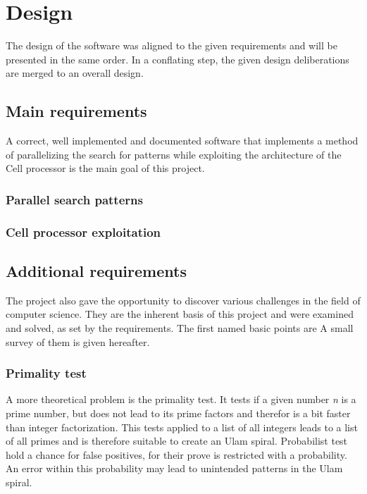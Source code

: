\section{Design}
\label{sec:design}
The design of the software was aligned to the given requirements and will be presented in the same order. In a conflating step, the given design deliberations are merged to an overall design.

\subsection{Main requirements}
\label{sec:main_req}
A correct, well implemented and documented software that implements a method of parallelizing the search for patterns while exploiting the architecture of the Cell processor is the main goal of this project.

\subsubsection{Parallel search patterns}
\label{sec:parallel_search}

\subsubsection{Cell processor exploitation}
\label{sec:cell_exploit}

\subsection{Additional requirements}
\label{sec:additional_req}
The project also gave the opportunity to discover various challenges in the field of computer science. They are the inherent basis of this project and were examined and solved, as set by the requirements. The first named basic points are A small survey of them is given hereafter.

\subsubsection{Primality test}
\label{sec:primality_test}
A more theoretical problem is the primality test. It tests if a given number \emph{n} is a prime number, but does not lead to its prime factors and therefor is a bit faster than integer factorization. This tests applied to a list of all integers leads to a list of all primes and is therefore suitable to create an Ulam spiral. Probabilist test hold a chance for false positives, for their prove is restricted with a probability. An error within this probability may lead to unintended patterns in the Ulam spiral.

